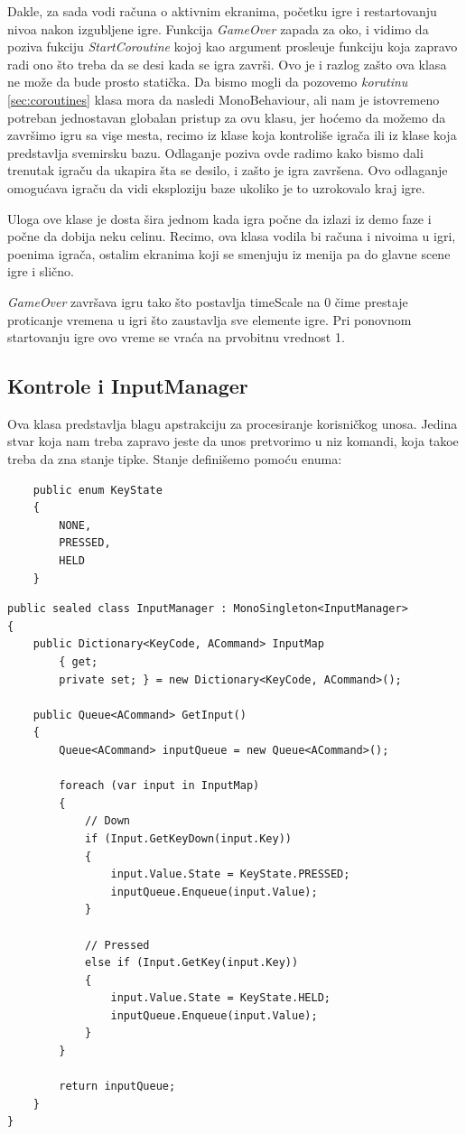 Dakle, za sada vodi ra\v{c}una o aktivnim ekranima, po\v{c}etku igre i restartovanju nivoa nakon izgubljene igre.
Funkcija \emph{GameOver} zapada za oko, i vidimo da poziva fukciju \emph{StartCoroutine} kojoj kao argument prosle\dj uje
funkciju koja zapravo radi ono \v{s}to treba da se desi kada se igra zavr\v{s}i. Ovo je i razlog za\v{s}to ova klasa
ne mo\v{z}e da bude prosto stati\v{c}ka. Da bismo mogli da pozovemo \emph{korutinu} \ref{sec:coroutines} klasa mora da nasledi
MonoBehaviour, ali nam je istovremeno potreban jednostavan globalan pristup za ovu klasu, jer ho\'cemo da mo\v{z}emo da
zavr\v{s}imo igru sa vi\c{s}e mesta, recimo iz klase koja kontroli\v{s}e igra\v{c}a ili iz klase koja predstavlja 
svemirsku bazu. Odlaganje poziva ovde radimo kako bismo dali trenutak igra\v{c}u da ukapira \v{s}ta se desilo, i za\v{s}to
je igra zavr\v{s}ena. Ovo odlaganje omogu\'cava igra\v{c}u da vidi eksploziju baze ukoliko je to uzrokovalo kraj igre.

Uloga ove klase je dosta \v{s}ira jednom kada igra po\v{c}ne da izlazi iz demo faze i po\v{c}ne da dobija neku celinu. Recimo,
ova klasa vodila bi ra\v{c}una i nivoima u igri, poenima igra\v{c}a, ostalim ekranima koji se smenjuju iz menija pa do glavne scene igre i sli\v{c}no.

\emph{GameOver} zavr\v{s}ava igru tako \v{s}to postavlja timeScale na 0 \v{c}ime prestaje proticanje
vremena u igri \v{s}to zaustavlja sve elemente igre. Pri ponovnom startovanju igre ovo vreme se vra\'ca na prvobitnu vrednost 1.

\subsection{Kontrole i InputManager}
Ova klasa predstavlja blagu apstrakciju za procesiranje korisni\v{c}kog unosa. Jedina stvar koja nam treba zapravo
jeste da unos pretvorimo u niz komandi, koja tako\dj e treba da zna stanje tipke. Stanje defini\v{s}emo pomo\'cu enuma:

\begin{verbatim}
    public enum KeyState
    {
        NONE,
        PRESSED,
        HELD
    }
\end{verbatim}

\begin{verbatim}
public sealed class InputManager : MonoSingleton<InputManager>
{
    public Dictionary<KeyCode, ACommand> InputMap 
        { get; 
        private set; } = new Dictionary<KeyCode, ACommand>();

    public Queue<ACommand> GetInput()
    {
        Queue<ACommand> inputQueue = new Queue<ACommand>();

        foreach (var input in InputMap)
        {
            // Down
            if (Input.GetKeyDown(input.Key))
            {
                input.Value.State = KeyState.PRESSED;
                inputQueue.Enqueue(input.Value);
            }

            // Pressed
            else if (Input.GetKey(input.Key))
            {
                input.Value.State = KeyState.HELD;
                inputQueue.Enqueue(input.Value);
            }
        }

        return inputQueue;
    }
}
\end{verbatim}

